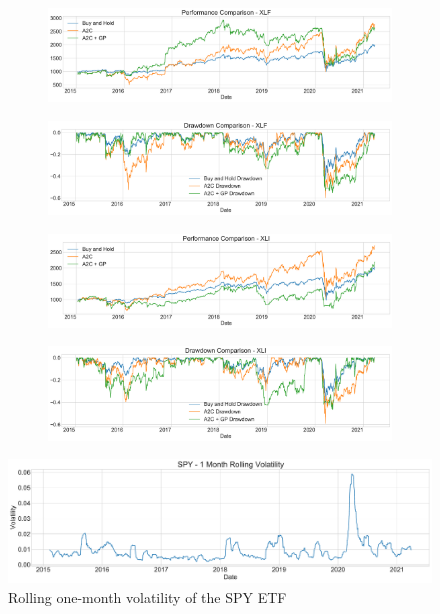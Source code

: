 \documentclass[12pt]{article}
\begin{document}
\begin{figure}[h]
	\centering
	\begin{subfigure}{\linewidth}
		\centering
		\includegraphics[width=\linewidth]{../src/figures/xlf_performance_comparison.pdf}
	\end{subfigure}
	\begin{subfigure}{\linewidth}
		\centering
		\includegraphics[width=\linewidth]{../src/figures/xlf_drawdowns_comparison.pdf}
	\end{subfigure}
	\caption{}
	\label{fig:xlf}
\end{figure}

\begin{figure}[h]
	\centering
	\begin{subfigure}{\linewidth}
		\centering
		\includegraphics[width=\linewidth]{../src/figures/xli_performance_comparison.pdf}
	\end{subfigure}
	\begin{subfigure}{\linewidth}
		\centering
		\includegraphics[width=\linewidth]{../src/figures/xli_drawdowns_comparison.pdf}
	\end{subfigure}
	\caption{}
	\label{fig:xli}
\end{figure}

\begin{figure}[h]
	\centering
	\includegraphics[width=\linewidth]{../src/figures/spy_volatility.pdf}
	\caption{Rolling one-month volatility of the SPY ETF}
	\label{fig:spy vol}
\end{figure}
\end{document}
